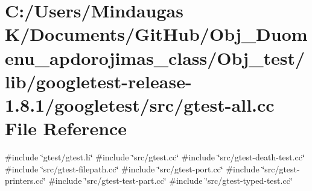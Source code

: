 \hypertarget{_obj__test_2lib_2googletest-release-1_88_81_2googletest_2src_2gtest-all_8cc}{}\section{C\+:/\+Users/\+Mindaugas K/\+Documents/\+Git\+Hub/\+Obj\+\_\+\+Duomenu\+\_\+apdorojimas\+\_\+class/\+Obj\+\_\+test/lib/googletest-\/release-\/1.8.1/googletest/src/gtest-\/all.cc File Reference}
\label{_obj__test_2lib_2googletest-release-1_88_81_2googletest_2src_2gtest-all_8cc}
{\ttfamily \#include \char`\"{}gtest/gtest.\+h\char`\"{}}\newline
{\ttfamily \#include \char`\"{}src/gtest.\+cc\char`\"{}}\newline
{\ttfamily \#include \char`\"{}src/gtest-\/death-\/test.\+cc\char`\"{}}\newline
{\ttfamily \#include \char`\"{}src/gtest-\/filepath.\+cc\char`\"{}}\newline
{\ttfamily \#include \char`\"{}src/gtest-\/port.\+cc\char`\"{}}\newline
{\ttfamily \#include \char`\"{}src/gtest-\/printers.\+cc\char`\"{}}\newline
{\ttfamily \#include \char`\"{}src/gtest-\/test-\/part.\+cc\char`\"{}}\newline
{\ttfamily \#include \char`\"{}src/gtest-\/typed-\/test.\+cc\char`\"{}}\newline
